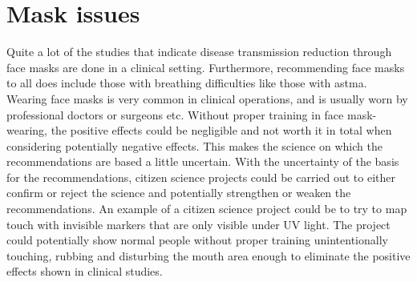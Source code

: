 \section*{Mask issues}
Quite a lot of the studies that indicate disease transmission reduction through face masks are done in a clinical setting. 
Furthermore, recommending face masks to all does include those with breathing difficulties like those with astma.
Wearing face masks is very common in clinical operations, and is usually worn by professional doctors or surgeons etc.
Without proper training in face mask-wearing, the positive effects could be negligible and not worth it in total when considering potentially negative effects.
This makes the science on which the recommendations are based a little uncertain. 
With the uncertainty of the basis for the recommendations, citizen science projects could be carried out to either confirm or reject the science and potentially strengthen or weaken the recommendations.
An example of a citizen science project could be to try to map touch with invisible markers that are only visible under UV light.
The project could potentially show normal people without proper training unintentionally touching, rubbing and disturbing the mouth area enough to eliminate the positive effects shown in clinical studies.




